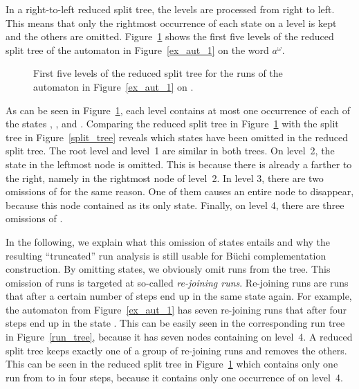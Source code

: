 In a right-to-left reduced split tree, the levels are processed from right to left. This means that only the rightmost occurrence of each state on a level is kept and the others are omitted. Figure~\ref{reduced_split_tree} shows the first five levels of the reduced split tree of the automaton in Figure~\ref{ex_aut_1} on the word $a^\omega$.


\begin{figure}[htb]
\centering
\ReducedSplitTreeRightLeft
\caption{First five levels of the reduced split tree for the runs of the automaton in Figure~\ref{ex_aut_1} on \aom.}
\label{reduced_split_tree}
\end{figure}

As can be seen in Figure~\ref{reduced_split_tree}, each level contains at most one occurrence of each of the states , , and . Comparing the reduced split tree in Figure~\ref{reduced_split_tree} with the split tree in Figure~\ref{split_tree} reveals which states have been omitted in the reduced split tree. The root level and level~1 are similar in both trees. On level~2, the state  in the leftmost node is omitted. This is because there is already a  farther to the right, namely in the rightmost node of level~2. In level 3, there are two omissions of  for the same reason. One of them causes an entire node to disappear, because this node contained  as its only state. Finally, on level 4, there are three omissions of .

In the following, we explain what this omission of states entails and why the resulting ``truncated'' run analysis is still usable for Büchi complementation construction. By omitting states, we obviously omit runs from the tree. This omission of runs is targeted at so-called \textit{re-joining runs}. Re-joining runs are runs that after a certain number of steps end up in the same state again. For example, the automaton from Figure~\ref{ex_aut_1} has seven re-joining runs that after four steps end up in the state . This can be easily seen in the corresponding run tree in Figure~\ref{run_tree}, because it has seven nodes containing  on level~4. A reduced split tree keeps exactly one of a group of re-joining runs and removes the others. This can be seen in the reduced split tree in Figure~\ref{reduced_split_tree} which contains only one run from  to  in four steps, because it contains only one occurrence of  on level~4.

